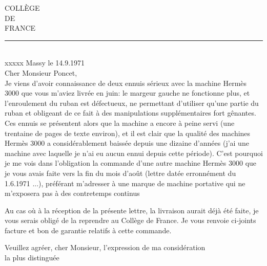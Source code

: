 COLLÈGE\\
DE\\
FRANCE\\
\rule{1em}{.4pt}\\
xxxxx Massy le 14.9.1971\\
Cher Monsieur Poncet,\\
Je viens d'avoir connaissance de deux ennuis sérieux avec la machine Hermès 3000 que vous m'aviez livrée en juin: le margeur gauche ne fonctionne plus, et l'enroulement du ruban est défectueux, ne permettant d'utiliser qu'une partie du ruban et obligeant de ce fait à des manipulations supplémentaires fort gênantes. Ces ennuis se présentent alors que la machine a encore à peine servi (une trentaine de pages de texte environ), et il est clair que la qualité des machines Hermès 3000 a considérablement baissée depuis une dizaine d'années (j'ai une machine avec laquelle je n'ai eu aucun ennui depuis cette période). C'est pourquoi je me vois dans l'obligation  la commande d'une autre machine Hermès 3000 que je vous avais faite vers la fin du mois d'août (lettre datée erronnément du 1.6.1971 ...), préférant m'adresser à une marque de machine portative qui ne m'exposera pas à des contretemps continus

Au cas où à la réception de la présente lettre, la livraison aurait déjà été faite, je vous serais obligé de la reprendre au Collège de France. Je vous renvoie ci-joints facture et bon de garantie relatifs à cette commande.

Veuillez agréer, cher Monsieur, l'expression de ma considération\\
la plus distinguée\\
